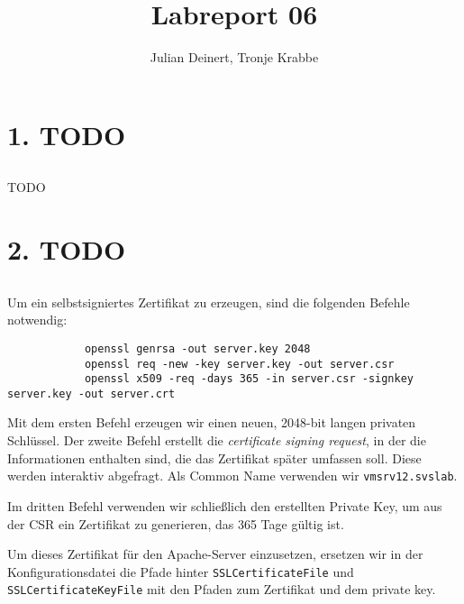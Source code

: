 \documentclass[10pt,a4paper]{article}
\author{Julian Deinert, Tronje Krabbe}
\title{Labreport 06}
\begin{document}
\maketitle
\tableofcontents
\thispagestyle{empty}
\newpage
\setcounter{page}{1}


\section*{1. TODO}
\setcounter{subsection}{1}

\subsection{}
TODO

\setcounter{section}{2}
\section*{2. TODO}
\setcounter{subsection}{0}
\subsection{}
\subsection{}
        Um ein selbstsigniertes Zertifikat zu erzeugen, sind die folgenden Befehle notwendig:

        \begin{verbatim}
			openssl genrsa -out server.key 2048
			openssl req -new -key server.key -out server.csr
			openssl x509 -req -days 365 -in server.csr -signkey server.key -out server.crt
        \end{verbatim}

        Mit dem ersten Befehl erzeugen wir einen neuen, 
        2048-bit langen privaten
        Schlüssel. 
        Der zweite Befehl erstellt die
        \textit{certificate signing request}, 
        in der die Informationen enthalten
        sind, die das Zertifikat später umfassen soll. 
        Diese werden interaktiv
        abgefragt. 
        Als Common Name verwenden wir \texttt{vmsrv12.svslab}.

        Im dritten Befehl verwenden wir schließlich 
        den erstellten Private Key,
        um aus der CSR ein Zertifikat zu generieren, 
        das 365 Tage gültig ist.

        Um dieses Zertifikat für den Apache-Server einzusetzen, ersetzen wir in
        der Konfigurationsdatei die Pfade hinter \texttt{SSLCertificateFile} und
        \texttt{SSLCertificateKeyFile} mit den Pfaden zum Zertifikat und dem
        private key.
\end{document}

